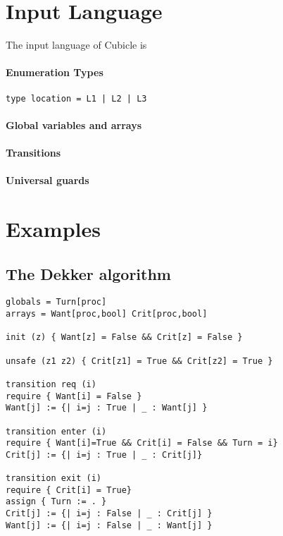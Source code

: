 \documentclass[a4paper,12pt]{article}
\begin{document}
\begin{verbatim}

\end{verbatim}

\section{Input Language}

The input language of Cubicle is 

\paragraph{Enumeration Types}

\begin{verbatim}
type location = L1 | L2 | L3
\end{verbatim}

\paragraph{Global variables and arrays}

\paragraph{Transitions}

\paragraph{Universal guards}

\section{Examples}

\subsection{The Dekker algorithm}

\begin{verbatim}
globals = Turn[proc]
arrays = Want[proc,bool] Crit[proc,bool]

init (z) { Want[z] = False && Crit[z] = False }

unsafe (z1 z2) { Crit[z1] = True && Crit[z2] = True }

transition req (i)
require { Want[i] = False }
Want[j] := {| i=j : True | _ : Want[j] }

transition enter (i)
require { Want[i]=True && Crit[i] = False && Turn = i}
Crit[j] := {| i=j : True | _ : Crit[j]}

transition exit (i)
require { Crit[i] = True}
assign { Turn := . }
Crit[j] := {| i=j : False | _ : Crit[j] }
Want[j] := {| i=j : False | _ : Want[j] }
\end{verbatim}
\end{document}
